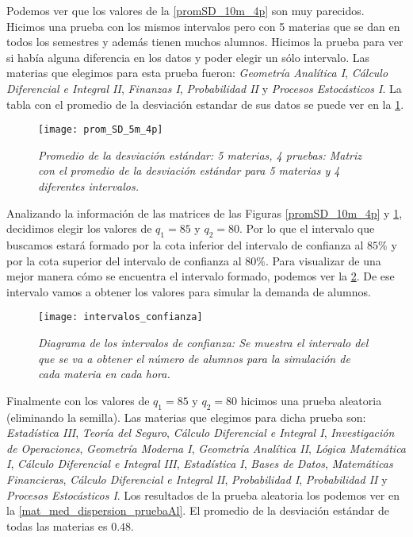 Podemos ver que los valores de la \figurename{\ref{promSD_10m_4p}} son muy parecidos. Hicimos una prueba con los mismos intervalos pero con 5 materias que se dan en todos los semestres y además tienen muchos alumnos. Hicimos la prueba para ver si había alguna diferencia en los datos y poder elegir un sólo intervalo. Las materias que elegimos para esta prueba fueron: \textit{Geometría Analítica I}, \textit{Cálculo Diferencial e Integral II}, \textit{Finanzas I}, \textit{Probabilidad II} y \textit{Procesos Estocásticos I}. La tabla con el promedio de la desviación estandar de sus datos se puede ver en la \figurename{\ref{promSD_5m_4p}}.


\begin{figure}[H]
\centering
\texttt{[image: prom\_SD\_5m\_4p]} %
\caption[\textit{Promedio de la desviación estándar: 5 materias, 4 pruebas}]{\textit{Promedio de la desviación estándar: 5 materias, 4 pruebas: Matriz con el promedio de la desviación estándar para 5 materias y 4 diferentes intervalos.}}\label{promSD_5m_4p}
\end{figure}

Analizando la información de las matrices de las Figuras \ref{promSD_10m_4p} y \ref{promSD_5m_4p}, decidimos elegir los valores de $q_{1} = 85$ y $q_{2} = 80$. Por lo que el intervalo que buscamos estará formado por la cota inferior del intervalo de confianza al $85\%$ y por la cota superior del intervalo de confianza al $80\%$. Para visualizar de una mejor manera cómo se encuentra el intervalo formado, podemos ver la \figurename{\ref{interConf}}. De ese intervalo vamos a obtener los valores para simular la demanda de alumnos.

\begin{figure}[H]
\centering
\texttt{[image: intervalos\_confianza]} %
\caption[\textit{Diagrama de los intervalos de confianza}]{\textit{Diagrama de los intervalos de confianza: Se muestra el intervalo del que se va a obtener el número de alumnos para la simulación de cada materia en cada hora.}}\label{interConf}
\end{figure}

Finalmente con los valores de $q_{1} = 85$ y $q_{2} = 80$ hicimos una prueba aleatoria (eliminando la semilla). Las materias que elegimos para dicha prueba son: \textit{Estadística III}, \textit{Teoría del Seguro}, \textit{Cálculo Diferencial e Integral I}, \textit{Investigación de Operaciones}, \textit{Geometría Moderna I}, \textit{Geometría Analítica II}, \textit{Lógica Matemática I}, \textit{Cálculo Diferencial e Integral III}, \textit{Estadística I}, \textit{Bases de Datos}, \textit{Matemáticas Financieras}, \textit{Cálculo Diferencial e Integral II}, \textit{Probabilidad I}, \textit{Probabilidad II} y \textit{Procesos Estocásticos I}. Los resultados de la prueba aleatoria los podemos ver en la \figurename{\ref{mat_med_dispersion_pruebaAl}}. El promedio de la desviación estándar de todas las materias es $0.48$.%

